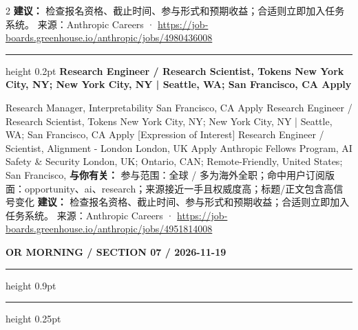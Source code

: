 \documentclass[10.5pt]{ctexart}
\begin{document}
\begin{multicols}{2}
\textbf{建议：} 检查报名资格、截止时间、参与形式和预期收益；合适则立即加入任务系统。
{\footnotesize\color{ormuted} 来源：Anthropic Careers · \url{https://job-boards.greenhouse.io/anthropic/jobs/4980436008}}
\vspace{2mm}
\hrule height 0.2pt
\vspace{2mm}
{\large\bfseries Research Engineer / Research Scientist, Tokens New York City, NY; New York City, NY | Seattle, WA; San Francisco, CA Apply}\par
[Expression of Interest] Research Manager, Interpretability San Francisco, CA Apply Research Engineer / Research Scientist, Tokens New York City, NY; New York City, NY | Seattle, WA; San Francisco, CA Apply [Expression of Interest] Research Engineer / Scientist, Alignment - London London, UK Apply Anthropic Fellows Program, AI Safety \& Security London, UK; Ontario, CAN; Remote-Friendly, United States; San Francisco, 
\textbf{与你有关：} 参与范围：全球 / 多为海外全职；命中用户订阅版面：opportunity、ai、research；来源接近一手且权威度高；标题/正文包含高信号变化
\textbf{建议：} 检查报名资格、截止时间、参与形式和预期收益；合适则立即加入任务系统。
{\footnotesize\color{ormuted} 来源：Anthropic Careers · \url{https://job-boards.greenhouse.io/anthropic/jobs/4951814008}}
\end{multicols}
\newpage
{\small\bfseries OR MORNING / SECTION 07 / 2026-11-19}
\vspace{2mm}
\hrule height 0.9pt
\vspace{1.5mm}
\hrule height 0.25pt
\vspace{4mm}
\end{document}
